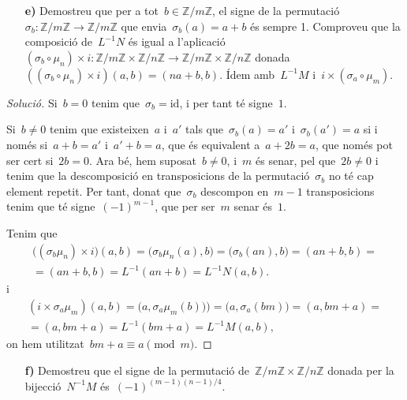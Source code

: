 \documentclass[a4paper]{article}
\newcommand{\ZZ}{\mathbb{Z}}
\newcommand{\id}{\mathrm{id}}
\newenvironment{solution}{
    \renewcommand\qedsymbol{\ensuremath{\lozenge}}
    \begin{proof}[Solució]
        }{
    \end{proof}
}
\begin{document}
\begin{enumerate}
    \item[\textbf{e)}] Demostreu que per a tot~\(b\in\ZZ/m\ZZ\), el signe de la
        permutació~\(\sigma_{b}:\ZZ/m\ZZ\rightarrow\ZZ/m\ZZ\) que
        envia~\(\sigma_{b}(a)=a+b\) és sempre 1.
        Comproveu que la composició de~\(L^{-1}N\) és igual a
        l'aplicació~\((\sigma_{b}\circ\mu_{n})\times
        i:\ZZ/m\ZZ\times\ZZ/n\ZZ\rightarrow\ZZ/m\ZZ\times\ZZ/n\ZZ\)
        donada~\(((\sigma_{b}\circ\mu_{n})\times i)(a,b)=(na+b,b)\).
        Ídem amb~\(L^{-1}M\) i~\(i\times(\sigma_{a}\circ\mu_{m})\).
\end{enumerate}

\begin{solution}
    Si~\(b=0\) tenim que~\(\sigma_{b}=\id\), i per tant té signe~\(1\).

    Si~\(b\neq0\) tenim que existeixen~\(a\) i~\(a'\) tals
    que~\(\sigma_{b}(a)=a'\) i~\(\sigma_{b}(a')=a\) si i només si~\(a+b=a'\)
    i~\(a'+b=a\), que és equivalent a~\(a+2b=a\), que només pot ser cert
    si~\(2b=0\). Ara bé, hem suposat~\(b\neq0\), i~\(m\) és senar, pel
    que~\(2b\neq0\) i tenim que la descomposició en transposicions de la
    permutació~\(\sigma_{b}\) no té cap element repetit. Per tant, donat
    que~\(\sigma_{b}\) descompon en~\(m-1\) transposicions tenim que té
    signe~\((-1)^{m-1}\), que per ser~\(m\) senar és~\(1\).

    Tenim que
    \begin{multline*}
        \bigl((\sigma_{b}\mu_{n})\times i\bigr)(a,b)
        =
        \bigl(\sigma_{b}\mu_{n}(a),b\bigr)
        =
        \bigl(\sigma_{b}(an),b\bigr)
        =
        (an+b,b)
        = \\ =
        (an+b,b)
        =
        L^{-1}(an+b)
        =
        L^{-1}N(a,b).
    \end{multline*}
    i
    \begin{multline*}
        (i\times\sigma_{a}\mu_{m})(a,b)
        =
        \bigl(a,\sigma_{a}\mu_{m}(b))\bigr)
        =
        \bigl(a,\sigma_{a}(bm)\bigr)
        =
        (a,bm+a)
        = \\ =
        (a,bm+a)
        =
        L^{-1}(bm+a)
        =
        L^{-1}M(a,b),
    \end{multline*}
    on hem utilitzat~\(bm+a\equiv a\pmod{m}\).
\end{solution}

\begin{enumerate}
    \item[\textbf{f)}] Demostreu que el signe de la permutació
        de~\(\ZZ/m\ZZ\times\ZZ/n\ZZ\) donada per la bijecció~\(N^{-1}M\)
        és~\((-1)^{(m-1)(n-1)/4}\).
\end{enumerate}
\end{document}
